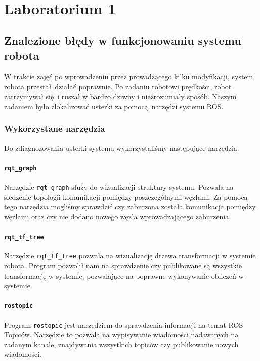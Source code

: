 \documentclass{mwrep}
\begin{document}
\tableofcontents

\chapter{Laboratorium 1}
\label{lab1}

\section{Znalezione błędy w funkcjonowaniu systemu robota}
\label{lab1_errors}
W trakcie zajęć po wprowadzeniu przez prowadzącego kilku modyfikacji,
system robota przestał działać poprawnie. Po zadaniu robotowi prędkości, 
robot zatrzymywał się i ruszał w bardzo dziwny i niezrozumiały sposób.
Naszym zadaniem było zlokalizować usterki za pomocą narzędzi
systemu ROS. 

\subsection{Wykorzystane narzędzia}
\label{lab1_errors_tools}
Do zdiagnozowania usterki systemu wykorzystaliśmy następujące narzędzia.

\subsubsection{\texttt{rqt\_{}graph}}
Narzędzie \texttt{rqt\_{}graph} służy do wizualizacji struktury systemu. Pozwala na
śledzenie topologii komunikacji pomiędzy poszczególnymi węzłami. Za pomocą tego narzędzia
mogliśmy sprawdzić czy zaburzona została komunikacja pomiędzy węzłami oraz czy
nie dodano nowego węzła wprowadzającego zaburzenia.

\subsubsection{\texttt{rqt\_{}tf\_{}tree}}
Narzędzie \texttt{rqt\_{}tf\_{}tree} pozwala na wizualizację drzewa transformacji 
w systemie robota. Program pozwolił nam na sprawdzenie czy publikowane są wszystkie
transformację w systemie, pozwalające na poprawne wykonywanie obliczeń w systemie.

\subsubsection{\texttt{rostopic}}
Program \texttt{rostopic} jest narzędziem do sprawdzenia informacji
na temat ROS Topiców. Narzędzie to pozwala na wypisywanie wiadomości 
nadawanych na zadanym kanale, znajdywania wszystkich topiców czy publikowanie
nowych wiadomości.
\end{document}
